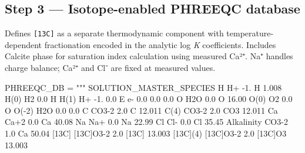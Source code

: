 \documentclass[
  letterpaper,
  DIV=11,
  numbers=noendperiod]{scrartcl}
\newenvironment{Shaded}{\begin{snugshade}}{\end{snugshade}}
\newcommand{\NormalTok}[1]{\textcolor[rgb]{0.00,0.23,0.31}{#1}}
\newcommand{\OperatorTok}[1]{\textcolor[rgb]{0.37,0.37,0.37}{#1}}
\newcommand{\StringTok}[1]{\textcolor[rgb]{0.13,0.47,0.30}{#1}}
\begin{document}
\subsection{Step 3 --- Isotope-enabled PHREEQC
database}\label{step-3-isotope-enabled-phreeqc-database}

Defines \texttt{{[}13C{]}} as a separate thermodynamic component with
temperature-dependent fractionation encoded in the analytic log \emph{K}
coefficients. Includes Calcite phase for saturation index calculation
using measured Ca²⁺. Na⁺ handles charge balance; Ca²⁺ and Cl⁻ are fixed
at measured values.

\begin{Shaded}
\begin{Highlighting}[]
\NormalTok{PHREEQC\_DB }\OperatorTok{=} \StringTok{"""}
\StringTok{SOLUTION\_MASTER\_SPECIES}
\StringTok{H        H+             {-}1.     H               1.008}
\StringTok{H(0)     H2             0.0     H}
\StringTok{H(1)     H+             {-}1.     0.0}
\StringTok{E        e{-}             0.0     0.0             0.0}
\StringTok{O        H2O            0.0     O               16.00}
\StringTok{O(0)     O2             0.0     O}
\StringTok{O({-}2)    H2O            0.0     0.0}
\StringTok{C        CO3{-}2          2.0     C               12.011}
\StringTok{C(4)     CO3{-}2          2.0     CO3             12.011}
\StringTok{Ca       Ca+2           0.0     Ca              40.08}
\StringTok{Na       Na+            0.0     Na              22.99}
\StringTok{Cl       Cl{-}            0.0     Cl              35.45}
\StringTok{Alkalinity CO3{-}2        1.0     Ca              50.04}
\StringTok{[13C]     [13C]O3{-}2      2.0     [13C]           13.003}
\StringTok{[13C](4)  [13C]O3{-}2      2.0     [13C]O3         13.003}


\end{Highlighting}
\end{Shaded}
\end{document}
